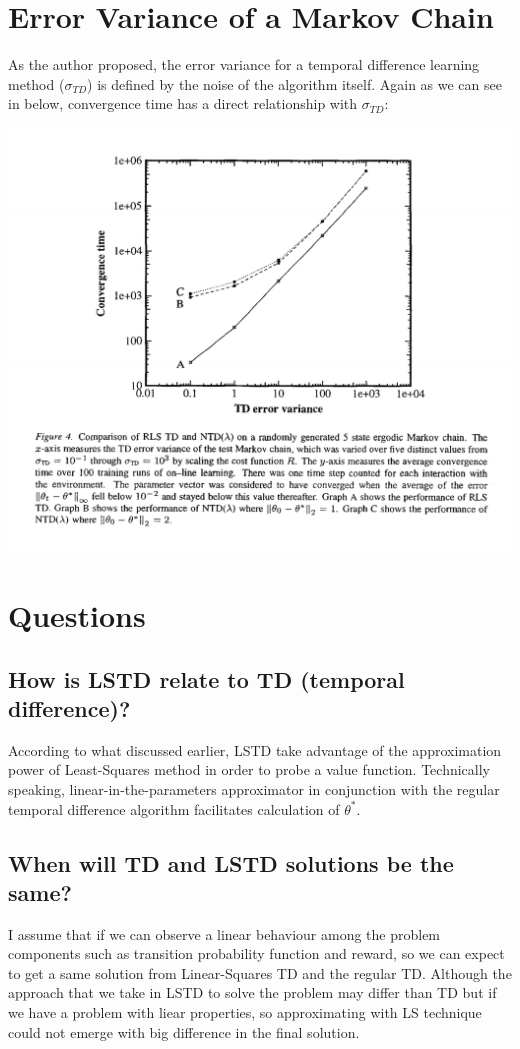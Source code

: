 \documentclass[a4paper,12pt]{article}
\begin{document}
\section{Error Variance of a Markov Chain}
As the author proposed, the error variance for a temporal difference learning method ($\sigma_{TD}$) is defined by the noise of the algorithm itself. Again as we can see in below, convergence time has a direct relationship with $\sigma_{TD}$:

\includegraphics[width=1\columnwidth]{fig4-error-var.png}

\section{Questions}
\subsection{How is LSTD relate to TD (temporal difference)?}
According to what discussed earlier, LSTD take advantage of the approximation power of  Least-Squares method in order to probe a value function. Technically speaking, linear-in-the-parameters approximator in conjunction with the regular temporal difference algorithm facilitates calculation of $\theta^*$.

\subsection{When will TD and LSTD solutions be the same?}
I assume that if we can observe a linear behaviour among the problem components such as transition probability function and reward, so we can expect to get a same solution from Linear-Squares TD and the regular TD. Although the approach that we take in LSTD to solve the problem may differ than TD but if we have a problem with liear properties, so approximating with LS technique could not emerge with big difference in the final solution.
\end{document}
